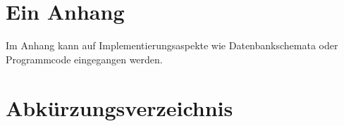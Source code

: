 \documentclass[listof=totocnumbered, bibliography=totocnumbered]{scrreprt}
\begin{document}
  \appendix
  
  \chapter{Ein Anhang}
  
  Im Anhang kann auf Implementierungsaspekte wie Datenbankschemata
  oder Programmcode eingegangen werden.
  
  
  \chapter{Abkürzungsverzeichnis}
  \begin{acronym}
    \setlength{\itemsep}{-\parsep}
  \end{acronym}
  
  
  \listoffigures
  
  
  \listoftables
  
  
  
  \cleardoublepage
  
\end{document}
